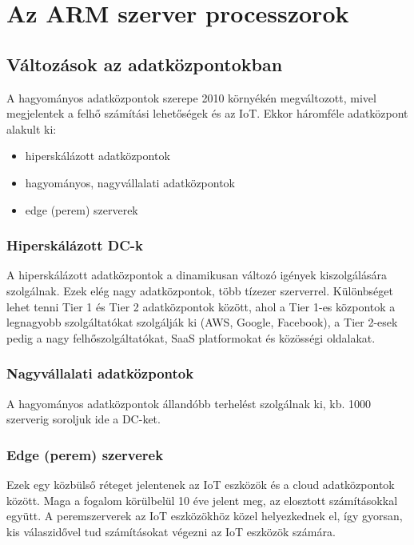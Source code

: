 
\chapter{Az ARM szerver processzorok}

\section{Változások az adatközpontokban}
A hagyományos adatközpontok szerepe 2010 környékén megváltozott, mivel megjelentek a felhő számítási lehetőségek és az IoT.
Ekkor háromféle adatközpont alakult ki:
\begin{itemize}
    \item hiperskálázott adatközpontok
    \item hagyományos, nagyvállalati adatközpontok
    \item edge (perem) szerverek
\end{itemize}

\subsection{Hiperskálázott DC-k}
A hiperskálázott adatközpontok a dinamikusan változó igények kiszolgálására szolgálnak.
Ezek elég nagy adatközpontok, több tízezer szerverrel.
Különbséget lehet tenni Tier 1 és Tier 2 adatközpontok között, ahol a Tier 1-es központok a legnagyobb szolgáltatókat szolgálják ki (AWS, Google, Facebook), a Tier 2-esek pedig a nagy felhőszolgáltatókat, SaaS platformokat és közösségi oldalakat.

\subsection{Nagyvállalati adatközpontok}
A hagyományos adatközpontok állandóbb terhelést szolgálnak ki, kb. 1000 szerverig soroljuk ide a DC-ket.

\subsection{Edge (perem) szerverek}
Ezek egy közbülső réteget jelentenek az IoT eszközök és a cloud adatközpontok között.
Maga a fogalom körülbelül 10 éve jelent meg, az elosztott számításokkal együtt.
A peremszerverek az IoT eszközökhöz közel helyezkednek el, így gyorsan, kis válaszidővel tud számításokat végezni az IoT eszközök számára.

